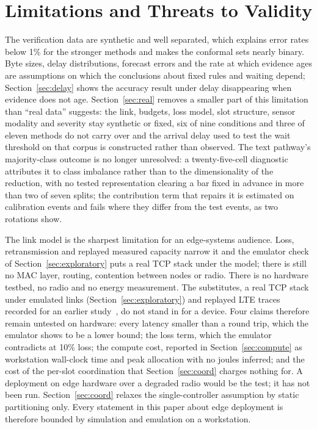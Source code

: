 \documentclass[conference,a4paper]{IEEEtran}
\begin{document}
\fi



\section{Limitations and Threats to Validity}
\label{sec:limits}
The verification data are synthetic and well separated, which explains error rates below 1\% for the stronger methods and makes the conformal sets nearly binary. Byte sizes, delay distributions, forecast errors and the rate at which evidence ages are assumptions on which the conclusions about fixed rules and waiting depend; Section~\ref{sec:delay} shows the accuracy result under delay disappearing when evidence does not age. Section~\ref{sec:real} removes a smaller part of this limitation than ``real data'' suggests: the link, budgets, loss model, slot structure, sensor modality and severity stay synthetic or fixed, six of nine conditions and three of eleven methods do not carry over and the arrival delay used to test the wait threshold on that corpus is constructed rather than observed. The text pathway's majority-class outcome is no longer unresolved: a twenty-five-cell diagnostic attributes it to class imbalance rather than to the dimensionality of the reduction, with no tested representation clearing a bar fixed in advance in more than two of seven splits; the contribution term that repairs it is estimated on calibration events and fails where they differ from the test events, as two rotations show.

The link model is the sharpest limitation for an edge-systems audience. Loss, retransmission and replayed measured capacity narrow it and the emulator check of Section~\ref{sec:exploratory} puts a real TCP stack under the model; there is still no MAC layer, routing, contention between nodes or radio. There is no hardware testbed, no radio and no energy measurement. The substitutes, a real TCP stack under emulated links (Section~\ref{sec:exploratory}) and replayed LTE traces recorded for an earlier study~\cite{sprout}, do not stand in for a device. Four claims therefore remain untested on hardware: every latency smaller than a round trip, which the emulator shows to be a lower bound; the loss term, which the emulator contradicts at 10\% loss; the compute cost, reported in Section~\ref{sec:compute} as workstation wall-clock time and peak allocation with no joules inferred; and the cost of the per-slot coordination that Section~\ref{sec:coord} charges nothing for. A deployment on edge hardware over a degraded radio would be the test; it has not been run. Section~\ref{sec:coord} relaxes the single-controller assumption by static partitioning only. Every statement in this paper about edge deployment is therefore bounded by simulation and emulation on a workstation.
\end{document}
